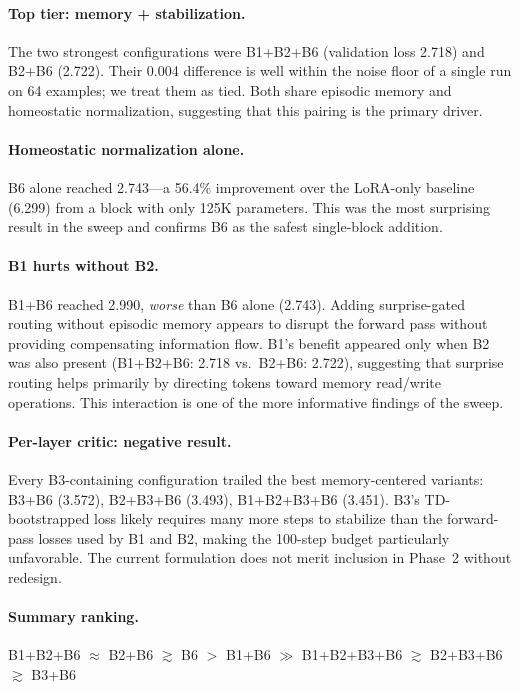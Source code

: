 \documentclass[11pt]{article}
\begin{document}
\paragraph{Top tier: memory + stabilization.}
The two strongest configurations were B1+B2+B6 (validation loss 2.718) and
B2+B6 (2.722).
Their 0.004 difference is well within the noise floor of a single run on 64
examples; we treat them as tied.
Both share episodic memory and homeostatic normalization, suggesting that this
pairing is the primary driver.

\paragraph{Homeostatic normalization alone.}
B6 alone reached 2.743---a 56.4\% improvement over the LoRA-only baseline
(6.299) from a block with only 125K parameters.
This was the most surprising result in the sweep and confirms B6 as the safest
single-block addition.

\paragraph{B1 hurts without B2.}
B1+B6 reached 2.990, \emph{worse} than B6 alone (2.743).
Adding surprise-gated routing without episodic memory appears to disrupt the
forward pass without providing compensating information flow.
B1's benefit appeared only when B2 was also present (B1+B2+B6: 2.718 vs.\
B2+B6: 2.722), suggesting that surprise routing helps primarily by directing
tokens toward memory read/write operations.
This interaction is one of the more informative findings of the sweep.

\paragraph{Per-layer critic: negative result.}
Every B3-containing configuration trailed the best memory-centered variants:
B3+B6 (3.572), B2+B3+B6 (3.493), B1+B2+B3+B6 (3.451).
B3's TD-bootstrapped loss likely requires many more steps to stabilize than the
forward-pass losses used by B1 and B2, making the 100-step budget particularly
unfavorable.
The current formulation does not merit inclusion in Phase~2 without redesign.

\paragraph{Summary ranking.}
\begin{center}
B1+B2+B6 $\approx$ B2+B6 $\gtrsim$ B6 $>$ B1+B6
$\gg$ B1+B2+B3+B6 $\gtrsim$ B2+B3+B6 $\gtrsim$ B3+B6
\end{center}
\end{document}
